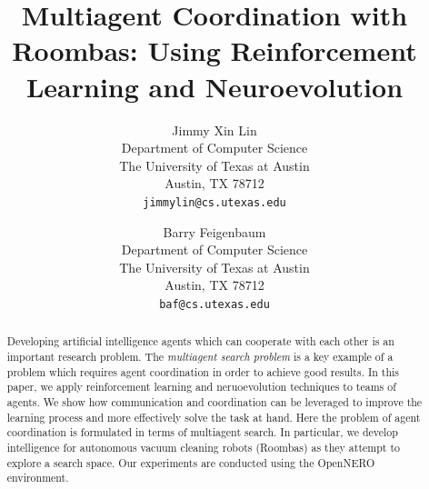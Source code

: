\documentclass[conference]{IEEEtran}
\begin{document}
%
\title{Multiagent Coordination with Roombas: Using
    Reinforcement Learning and Neuroevolution}



\author{ 
Jimmy Xin Lin \\
Department of Computer Science\\
The University of Texas at Austin\\
Austin, TX 78712 \\
\texttt{jimmylin@cs.utexas.edu} \\
\and
Barry Feigenbaum \\
Department of Computer Science\\
The University of Texas at Austin\\
Austin, TX 78712 \\
\texttt{baf@cs.utexas.edu} \\
}

\maketitle

\begin{abstract}
    Developing artificial intelligence agents which can cooperate with each other is an important research problem. The \textit{multiagent search problem} is a key example of a problem which requires agent coordination in order to achieve good results. 
    In this paper, we apply reinforcement learning and neruoevolution techniques to teams of agents. We show how communication and coordination can be leveraged to improve the learning process and more effectively solve the task at hand. 
    Here the problem of agent coordination is formulated in terms of multiagent search. In particular, we develop intelligence for autonomous vacuum cleaning robots (Roombas) as they attempt to explore a search space. 
    Our experiments are conducted using the OpenNERO environment.
\end{abstract}

\IEEEpeerreviewmaketitle
\end{document}
